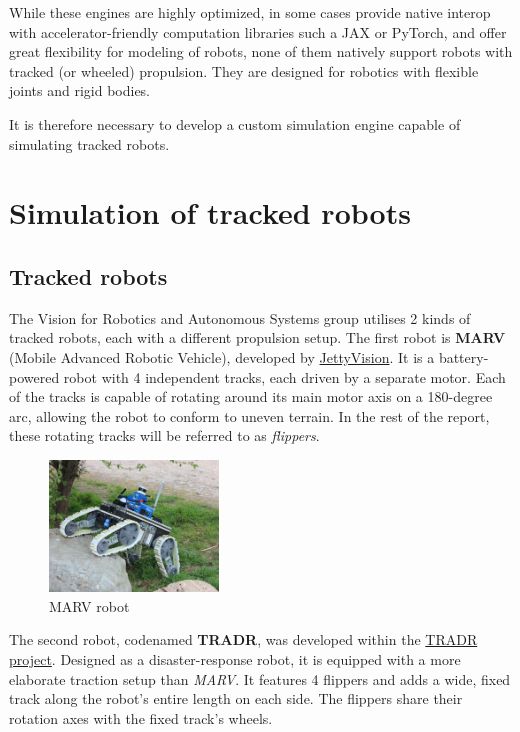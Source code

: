 \documentclass[a4paper,12pt]{article}
\begin{document}
While these engines are highly optimized, in some cases provide native interop with accelerator-friendly computation libraries such a JAX or PyTorch, and offer great flexibility for modeling of robots, none of them natively support robots with tracked (or wheeled) propulsion. They are designed for robotics with flexible joints and rigid bodies.

It is therefore necessary to develop a custom simulation engine capable of simulating tracked robots.


\clearpage


\section{Simulation of tracked robots}
\label{sec:robots_props}

\subsection{Tracked robots}
\label{sec:robots}

The Vision for Robotics and Autonomous Systems group utilises 2 kinds of tracked robots, each with a different propulsion setup. The first robot is \textbf{MARV} (Mobile Advanced Robotic Vehicle), developed by \href{https://jettyvision.cz/servisni-robot-marv/}{JettyVision}. It is a battery-powered robot with 4 independent tracks, each driven by a separate motor. Each of the tracks is capable of rotating around its main motor axis on a 180-degree arc, allowing the robot to conform to uneven terrain. In the rest of the report, these rotating tracks will be referred to as \textit{flippers}.

\begin{figure}[!h]
  \centering
  \includegraphics[width=0.4\textwidth]{fig/marv.jpg}
  \caption{MARV robot \citep{MARVphoto}}
  \label{fig:marv}
\end{figure}

The second robot, codenamed \textbf{TRADR}, was developed within the \href{https://www.tradr-project.eu/}{TRADR project}. Designed as a disaster-response robot, it is equipped with a more elaborate traction setup than \textit{MARV}. It features 4 flippers and adds a wide, fixed track along the robot's entire length on each side. The flippers share their rotation axes with the fixed track's wheels. 
\end{document}
